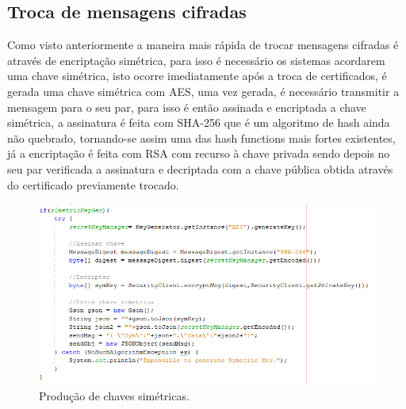 \documentclass[pdftex,12pt,a4paper]{report}
\begin{document}
\subsection{Troca de mensagens cifradas}
Como visto anteriormente a maneira mais rápida de trocar mensagens cifradas é através de encriptação simétrica, para isso é necessário os sistemas acordarem uma chave simétrica, isto ocorre imediatamente após a troca de certificados, é gerada uma chave simétrica com AES, uma vez gerada, é necessário transmitir a mensagem para o seu par, para isso é então assinada e encriptada a chave simétrica, a assinatura é feita com SHA-256 que é um algoritmo de hash ainda não quebrado, tornando-se assim uma das hash functions mais fortes existentes, já a encriptação é feita com RSA com recurso à chave privada sendo depois no seu par verificada a assinatura e decriptada com a chave pública obtida através do certificado previamente trocado. 
\begin{figure}[h]
    \centering
    \includegraphics[width=15.0cm]{key.png}
    \caption{Produção de chaves simétricas.}
    \label{fig:mesh1}
\end{figure}
\end{document}
